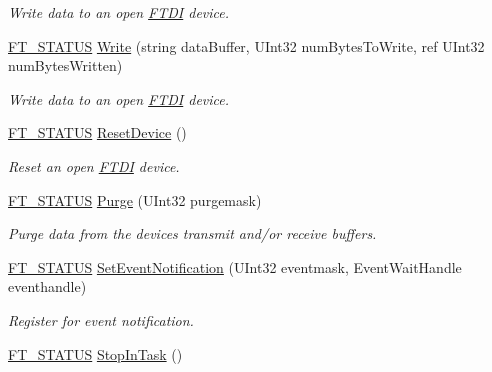 \begin{DoxyCompactItemize}
\begin{DoxyCompactList}\small\item\em Write data to an open \mbox{\hyperlink{class_f_t_d2_x_x___n_e_t_1_1_f_t_d_i}{F\+T\+DI}} device. \end{DoxyCompactList}\item 
\mbox{\hyperlink{class_f_t_d2_x_x___n_e_t_1_1_f_t_d_i_aabe20ad905cc4ccc1e35dd5b877d9a83}{F\+T\+\_\+\+S\+T\+A\+T\+US}} \mbox{\hyperlink{class_f_t_d2_x_x___n_e_t_1_1_f_t_d_i_a488f708d318983c03e98b0d8a8d5ed6f}{Write}} (string data\+Buffer, U\+Int32 num\+Bytes\+To\+Write, ref U\+Int32 num\+Bytes\+Written)
\begin{DoxyCompactList}\small\item\em Write data to an open \mbox{\hyperlink{class_f_t_d2_x_x___n_e_t_1_1_f_t_d_i}{F\+T\+DI}} device. \end{DoxyCompactList}\item 
\mbox{\hyperlink{class_f_t_d2_x_x___n_e_t_1_1_f_t_d_i_aabe20ad905cc4ccc1e35dd5b877d9a83}{F\+T\+\_\+\+S\+T\+A\+T\+US}} \mbox{\hyperlink{class_f_t_d2_x_x___n_e_t_1_1_f_t_d_i_a13cf6c0edaf5e92375c962203c1b27b9}{Reset\+Device}} ()
\begin{DoxyCompactList}\small\item\em Reset an open \mbox{\hyperlink{class_f_t_d2_x_x___n_e_t_1_1_f_t_d_i}{F\+T\+DI}} device. \end{DoxyCompactList}\item 
\mbox{\hyperlink{class_f_t_d2_x_x___n_e_t_1_1_f_t_d_i_aabe20ad905cc4ccc1e35dd5b877d9a83}{F\+T\+\_\+\+S\+T\+A\+T\+US}} \mbox{\hyperlink{class_f_t_d2_x_x___n_e_t_1_1_f_t_d_i_ab30085b5c2261995546e07f38b30874d}{Purge}} (U\+Int32 purgemask)
\begin{DoxyCompactList}\small\item\em Purge data from the devices transmit and/or receive buffers. \end{DoxyCompactList}\item 
\mbox{\hyperlink{class_f_t_d2_x_x___n_e_t_1_1_f_t_d_i_aabe20ad905cc4ccc1e35dd5b877d9a83}{F\+T\+\_\+\+S\+T\+A\+T\+US}} \mbox{\hyperlink{class_f_t_d2_x_x___n_e_t_1_1_f_t_d_i_a4bd0ad132e9632a6b7423c21e9a20be4}{Set\+Event\+Notification}} (U\+Int32 eventmask, Event\+Wait\+Handle eventhandle)
\begin{DoxyCompactList}\small\item\em Register for event notification. \end{DoxyCompactList}\item 
\mbox{\hyperlink{class_f_t_d2_x_x___n_e_t_1_1_f_t_d_i_aabe20ad905cc4ccc1e35dd5b877d9a83}{F\+T\+\_\+\+S\+T\+A\+T\+US}} \mbox{\hyperlink{class_f_t_d2_x_x___n_e_t_1_1_f_t_d_i_a2ec9e4bd045d229e510157d715645749}{Stop\+In\+Task}} ()

\end{DoxyCompactItemize}
